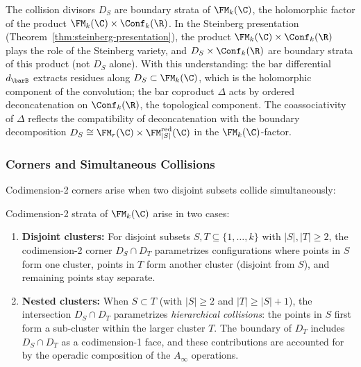 \begin{remark}
\label{rem:collision-steinberg}
The collision divisors $D_S$ are boundary strata of $\FM_k(\C)$,
the holomorphic factor of the product
$\FM_k(\C) \times \Conf_k(\R)$. In the Steinberg presentation
(Theorem~\ref{thm:steinberg-presentation}), the product
$\FM_k(\C) \times \Conf_k(\R)$ plays the role of the Steinberg
variety, and $D_S \times \Conf_k(\R)$ are boundary strata of this
product (not $D_S$ alone). With this understanding: the bar
differential $d_{\barB}$ extracts residues along
$D_S \subset \FM_k(\C)$, which is the holomorphic component of
the convolution; the bar coproduct $\Delta$ acts by ordered
deconcatenation on $\Conf_k(\R)$, the topological component.
The coassociativity of $\Delta$ reflects the compatibility of
deconcatenation with the boundary decomposition
$D_S \cong \FM_r(\C) \times \FM_{|S|}^{\mathrm{red}}(\C)$ in the
$\FM_k(\C)$-factor.
\end{remark}

\subsubsection{Corners and Simultaneous Collisions}

Codimension-2 corners arise when two disjoint subsets collide simultaneously:

\begin{definition}
\label{def:codim2-corners}
Codimension-2 strata of $\FM_k(\C)$ arise in two cases:
\begin{enumerate}[label=(\alph*)]
\item \textbf{Disjoint clusters:} For disjoint subsets $S, T \subseteq \{1,\ldots,k\}$ with $|S|, |T| \geq 2$, the codimension-2 corner $D_S \cap D_T$ parametrizes configurations where points in $S$ form one cluster, points in $T$ form another cluster (disjoint from $S$), and remaining points stay separate.

\item \textbf{Nested clusters:} When $S \subset T$ (with $|S| \geq 2$ and $|T| \geq |S| + 1$), the intersection $D_S \cap D_T$ parametrizes \emph{hierarchical collisions}: the points in $S$ first form a sub-cluster within the larger cluster $T$. The boundary of $D_T$ includes $D_S \cap D_T$ as a codimension-1 face, and these contributions are accounted for by the operadic composition of the $A_\infty$ operations.
\end{enumerate}
\end{definition}

